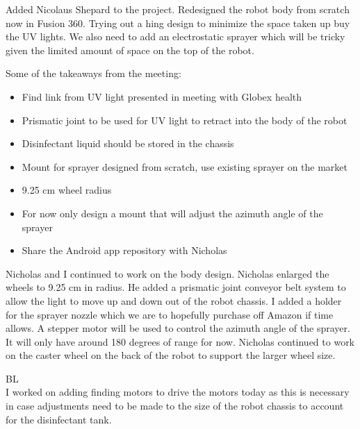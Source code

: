 \documentclass[fontsize=11pt, %
                             paper=a4, %
                             twoside, %
                             captions=tableheading,
                             index=totoc,
                             hyperref]{labbook}
\begin{document}
\begin{addmargin}[0cm]{0cm}
 Added Nicolaus Shepard to the project. Redesigned the robot body from scratch now in Fusion 360. Trying out a hing design to minimize the space taken up buy the UV lights. We also need to add an electrostatic sprayer which will be tricky given the limited amount of space on the top of the robot.

Some of the takeaways from the meeting:
\begin{itemize}
\item Find link from UV light presented in meeting with Globex health
\item Prismatic joint to be used for UV light to retract into the body of the robot
\item Disinfectant liquid should be stored in the chassis
\item Mount for sprayer designed from scratch, use existing sprayer on the market
\item 9.25 cm wheel radius
\item For now only design a mount that will adjust the azimuth angle of the sprayer
\item Share the Android app repository with Nicholas
\end{itemize}
Nicholas and I continued to work on the body design. Nicholas enlarged the wheels to 9.25 cm in radius. He added a prismatic joint conveyor belt system to allow the light to move up and down out of the robot chassis. I added a holder for the sprayer nozzle which we are to hopefully purchase off Amazon if time allows. A stepper motor will be used to control the azimuth angle of the sprayer. It will only have around 180 degrees of range for now. Nicholas continued to work on the caster wheel on the back of the robot to support the larger wheel size.

BL\\
I worked on adding finding motors to drive the motors today as this is necessary in case adjustments need to be made to the size of the robot chassis to account for the disinfectant tank.


\end{addmargin}
\end{document}
